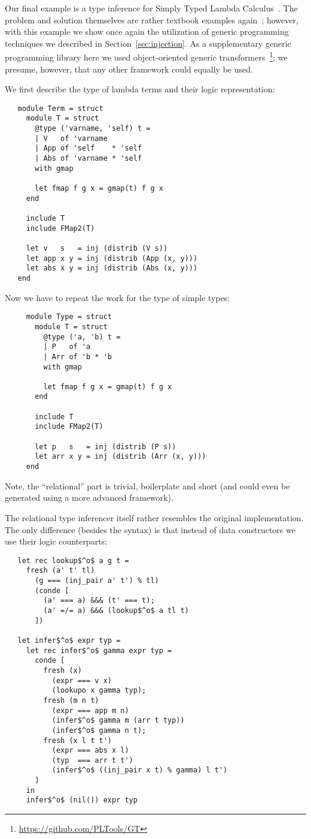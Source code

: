 Our final example is a type inference for Simply Typed Lambda Calculus~\cite{Lambda}. The problem and
solution themselves are rather textbook examples again~\cite{TRS, WillThesis}; however, with this example
we show once again the utilization of generic programming techniques we described in Section~\ref{sec:injection}.
As a supplementary generic programming library here we used object-oriented generic transformers~\cite{?}\footnote{\url{https://github.com/PLTools/GT}};
we presume, however, that any other framework could equally be used.

We first describe the type of lambda terms and their logic representation:

\begin{lstlisting}
   module Term = struct
     module T = struct
       @type ('varname, 'self) t =
       | V   of 'varname
       | App of 'self    * 'self
       | Abs of 'varname * 'self
       with gmap

       let fmap f g x = gmap(t) f g x
     end

     include T
     include FMap2(T)

     let v   s   = inj (distrib (V s))
     let app x y = inj (distrib (App (x, y)))
     let abs x y = inj (distrib (Abs (x, y)))
   end
\end{lstlisting}

Now we have to repeat the work for the type of simple types:

\begin{lstlisting}
     module Type = struct
       module T = struct
         @type ('a, 'b) t =
         | P   of 'a
         | Arr of 'b * 'b
         with gmap

         let fmap f g x = gmap(t) f g x
       end

       include T
       include FMap2(T)

       let p   s   = inj (distrib (P s))
       let arr x y = inj (distrib (Arr (x, y)))
     end
\end{lstlisting}

Note, the ``relational'' part is trivial, boilerplate and short (and could even be generated
using a more advanced framework).

The relational type inferencer itself rather resembles the original implementation. The only
difference (besides the syntax) is that instead of data constructors we use their logic
counterparts:

\begin{lstlisting}
   let rec lookup$^o$ a g t =
     fresh (a' t' tl)
       (g === (inj_pair a' t') % tl)
       (conde [
         (a' === a) &&& (t' === t);
         (a' =/= a) &&& (lookup$^o$ a tl t)
       ])

   let infer$^o$ expr typ =
     let rec infer$^o$ gamma expr typ =
       conde [
         fresh (x)
           (expr === v x)
           (lookupo x gamma typ);
         fresh (m n t)
           (expr === app m n)
           (infer$^o$ gamma m (arr t typ))
           (infer$^o$ gamma n t);
         fresh (x l t t')
           (expr === abs x l)
           (typ  === arr t t')
           (infer$^o$ ((inj_pair x t) % gamma) l t')
       ]
     in
     infer$^o$ (nil()) expr typ
\end{lstlisting}
